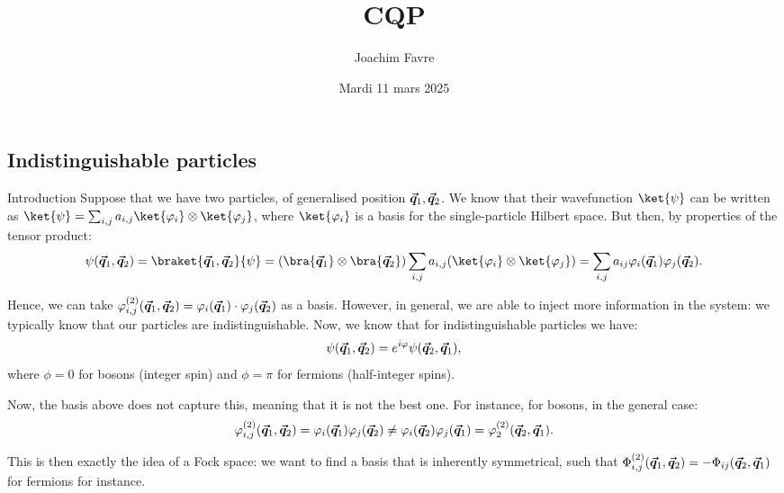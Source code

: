 \documentclass[a4paper]{article}
\title{CQP}
\author{Joachim Favre}
\date{Mardi 11 mars 2025}
\begin{document}
\maketitle


\subsection{Indistinguishable particles}

\begin{parag}{Introduction}
    Suppose that we have two particles, of generalised position $\bm{\protect\vec{q}}_1, \bm{\protect\vec{q}}_2$. We know that their wavefunction $\ket{\psi}$ can be written as $\ket{\psi} = \sum_{i, j} a_{i, j} \ket{\phi_i} \otimes \ket{\phi_j}$, where $\ket{\phi_i}$ is a basis for the single-particle Hilbert space. But then, by properties of the tensor product: 
    \[\psi\left(\bvec{q}_1, \bvec{q}_2\right) = \braket{\bvec{q}_1,\bvec{q}_2}{\psi} = \left(\bra{\bvec{q}_1} \otimes \bra{\bvec{q}_2}\right) \sum_{i, j} a_{i, j} \left(\ket{\phi_i} \otimes \ket{\phi_j}\right) = \sum_{i, j} a_{ij} \phi_i\left(\bvec{q}_1\right) \phi_j\left(\bvec{q}_2\right).\]
    
    Hence, we can take $\phi_{i, j}^{\left(2\right)}\left(\bvec{q}_1, \bvec{q}_2\right) = \phi_i\left(\bvec{q}_1\right)\cdot \phi_j\left(\bvec{q}_2\right)$ as a basis. However, in general, we are able to inject more information in the system: we typically know that our particles are indistinguishable. Now, we know that for indistinguishable particles we have: 
    \[\psi\left(\bvec{q}_1, \bvec{q}_2\right) = e^{i \phi} \psi\left(\bvec{q}_2, \bvec{q}_1\right),\]
    where $\phi = 0$ for bosons (integer spin) and $\phi = \pi$ for fermions (half-integer spins).
    
    Now, the basis above does not capture this, meaning that it is not the best one. For instance, for bosons, in the general case:
    \[\phi_{i, j}^{\left(2\right)}\left(\bvec{q}_1, \bvec{q}_2\right) = \phi_i\left(\bvec{q}_1\right) \phi_j\left(\bvec{q}_2\right) \neq  \phi_i\left(\bvec{q}_2\right) \phi_j\left(\bvec{q}_1\right) = \phi_2^{\left(2\right)}\left(\bvec{q}_2, \bvec{q}_1\right).\]

    This is then exactly the idea of a Fock space: we want to find a basis that is inherently symmetrical, such that $\Phi_{i, j}^{\left(2\right)}\left(\bvec{q}_1, \bvec{q}_2\right) = - \Phi_{ij}\left(\bvec{q}_2, \bvec{q}_1\right)$ for fermions for instance.
\end{parag}
\end{document}
